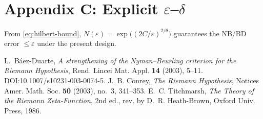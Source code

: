\documentclass[11pt]{article}
\theoremstyle{remark}
\begin{document}
\section*{Appendix C: Explicit $\varepsilon$--$\delta$}
From \eqref{eq:hilbert-bound}, $N(\varepsilon)=\exp\!\big((2C/\varepsilon)^{2/\theta}\big)$ guarantees the NB/BD error $\le\varepsilon$ under the present design.

\begin{thebibliography}{9}
 L.~B\'aez-Duarte, \emph{A strengthening of the Nyman--Beurling criterion for the Riemann Hypothesis}, Rend. Lincei Mat. Appl. \textbf{14} (2003), 5--11. DOI:10.1007/s10231-003-0074-5.
 J.~B. Conrey, \emph{The Riemann Hypothesis}, Notices Amer. Math. Soc. \textbf{50} (2003), no.~3, 341--353.
 E.~C. Titchmarsh, \emph{The Theory of the Riemann Zeta-Function}, 2nd ed., rev. by D.~R. Heath-Brown, Oxford Univ. Press, 1986.
\end{thebibliography}
\end{document}
